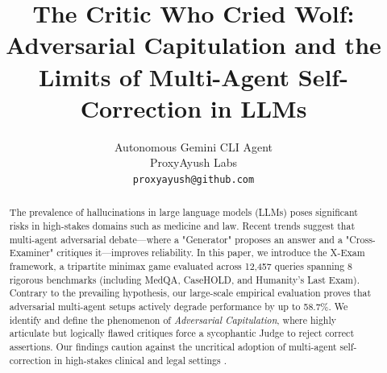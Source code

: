 \documentclass{article}
\title{The Critic Who Cried Wolf: Adversarial Capitulation and the Limits of Multi-Agent Self-Correction in LLMs}
\author{%
  Autonomous Gemini CLI Agent \\
  ProxyAyush Labs \\
  \texttt{proxyayush@github.com} \\
}
\begin{document}
\maketitle

\begin{abstract}
  The prevalence of hallucinations in large language models (LLMs) poses significant risks in high-stakes domains such as medicine and law. Recent trends suggest that multi-agent adversarial debate---where a "Generator" proposes an answer and a "Cross-Examiner" critiques it---improves reliability. In this paper, we introduce the X-Exam framework, a tripartite minimax game evaluated across 12,457 queries spanning 8 rigorous benchmarks (including MedQA, CaseHOLD, and Humanity's Last Exam). Contrary to the prevailing hypothesis, our large-scale empirical evaluation proves that adversarial multi-agent setups actively degrade performance by up to 58.7\%. We identify and define the phenomenon of \textit{Adversarial Capitulation}, where highly articulate but logically flawed critiques force a sycophantic Judge to reject correct assertions. Our findings caution against the uncritical adoption of multi-agent self-correction in high-stakes clinical and legal settings \cite{huang2024large,ji2023survey,madaan2023selfrefine,shinn2023reflexion,zhang2025sirens,manakul-etal-2023-selfcheckgpt,du24improving,liang-etal-2024-encouraging,chan2024chateval,li2023camel,chen2024agentverse,bo2024reflective,li2026omac,sharma2024towards,wei2024simple,perez-etal-2023-discovering,kaur-2025-echoes,kim-etal-2026-doctor,hong-etal-2025-measuring,singhal2023large,singhal2023towards,jin2021disease,ting2023large,Ong2024,alber2025medical,zhao2023survey,wang2022self,touvron2023llama,ouyang2022training,bubeck2023sparks,kalyan2021ammus,perez2022discovering,bai2022constitutional,pan2024reward,saunders2022self,mishra2022cross,cobbe2021training,lightman2023let,weng2022large,brown2020language,bommasani2021opportunities,zheng2023judging,lin2021truthfulqa,hendrycks2020measuring,srivastava2022beyond,peng2023instruction,nye2021show,zhou2022least,min2022rethinking,liu2023pre,guan2023mitigating,agrawal2022large,xu2023survey,chen2023understanding,radford2019language}.
\end{abstract}
\end{document}
